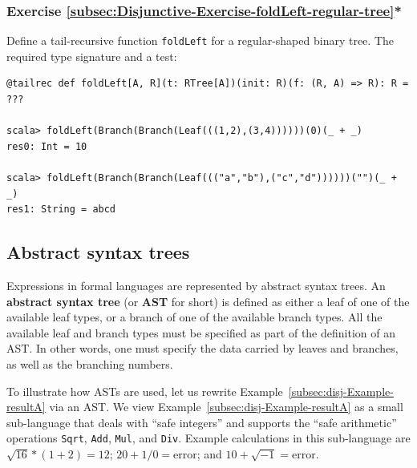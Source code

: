 \subsubsection{Exercise \label{subsec:Disjunctive-Exercise-foldLeft-regular-tree}\ref{subsec:Disjunctive-Exercise-foldLeft-regular-tree}{*}}

Define a tail-recursive function \lstinline!foldLeft! for a regular-shaped
binary tree. The required type signature and a test:
\begin{lstlisting}
@tailrec def foldLeft[A, R](t: RTree[A])(init: R)(f: (R, A) => R): R = ???

scala> foldLeft(Branch(Branch(Leaf(((1,2),(3,4))))))(0)(_ + _)
res0: Int = 10

scala> foldLeft(Branch(Branch(Leaf((("a","b"),("c","d"))))))("")(_ + _)
res1: String = abcd
\end{lstlisting}

\subsection{Abstract syntax trees}

Expressions in formal languages are represented by abstract syntax
trees. An \textbf{abstract syntax tree}\textbf{
}(or \textbf{AST} for short) is defined as either a leaf of one of
the available leaf types, or a branch of one of the available branch
types. All the available leaf and branch types must be specified as
part of the definition of an AST. In other words, one must specify
the data carried by leaves and branches, as well as the branching
numbers.

To illustrate how ASTs are used, let us rewrite Example~\ref{subsec:disj-Example-resultA}
via an AST. We view Example~\ref{subsec:disj-Example-resultA} as
a small sub-language that deals with ``safe integers'' and supports
the ``safe arithmetic'' operations \lstinline!Sqrt!, \lstinline!Add!,
\lstinline!Mul!, and \lstinline!Div!. Example calculations in this
sub-language are $\sqrt{16}*(1+2)=12$; $20+1/0=\text{error}$; and
$10+\sqrt{-1}=\text{error}$. 


